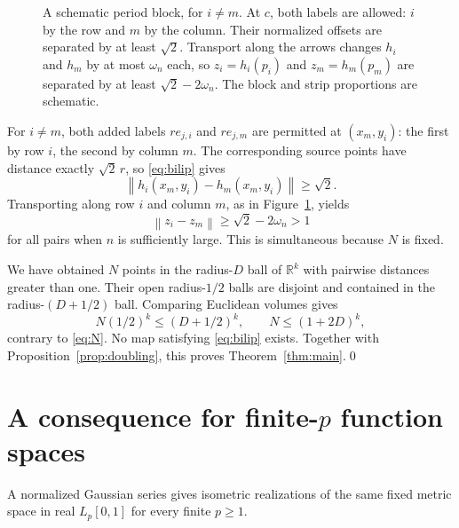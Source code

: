 \documentclass[11pt]{article}
\newcommand{\R}{\mathbb R}
\newcommand{\norm}[1]{\left\lVert#1\right\rVert}
\begin{document}
\begin{figure}[!hb]
\centering
{}
\caption{A schematic period block, for $i\ne m$. At $c$, both labels are allowed: $i$ by the row and $m$ by the column. Their normalized offsets are separated by at least $\sqrt2$. Transport along the arrows changes $h_i$ and $h_m$ by at most $\omega_n$ each, so $z_i=h_i(p_i)$ and $z_m=h_m(p_m)$ are separated by at least $\sqrt2-2\omega_n$. The block and strip proportions are schematic.}
\label{fig:crossing}
\end{figure}

For $i\ne m$, both added labels $re_{j,i}$ and $re_{j,m}$ are permitted at $(x_m,y_i)$: the first by row $i$, the second by column $m$. The corresponding source points have distance exactly $\sqrt2\,r$, so \eqref{eq:bilip} gives
\[
 \norm{h_i(x_m,y_i)-h_m(x_m,y_i)}\ge\sqrt2.
\]
Transporting along row $i$ and column $m$, as in Figure~\ref{fig:crossing}, yields
\[
 \norm{z_i-z_m}\ge\sqrt2-2\omega_n>1
\]
for all pairs when $n$ is sufficiently large. This is simultaneous because $N$ is fixed.

We have obtained $N$ points in the radius-$D$ ball of $\R^k$ with pairwise distances greater than one. Their open radius-$1/2$ balls are disjoint and contained in the radius-$(D+1/2)$ ball. Comparing Euclidean volumes gives
\[
 N(1/2)^k\le(D+1/2)^k,\qquad N\le(1+2D)^k,
\]
contrary to \eqref{eq:N}. No map satisfying \eqref{eq:bilip} exists. Together with Proposition~\ref{prop:doubling}, this proves Theorem~\ref{thm:main}.\qed

\section{A consequence for finite-\texorpdfstring{$p$}{p} function spaces}
\label{sec:lp}
A normalized Gaussian series gives isometric realizations of the same fixed metric space in real $L_p[0,1]$ for every finite $p\ge1$.
\end{document}
